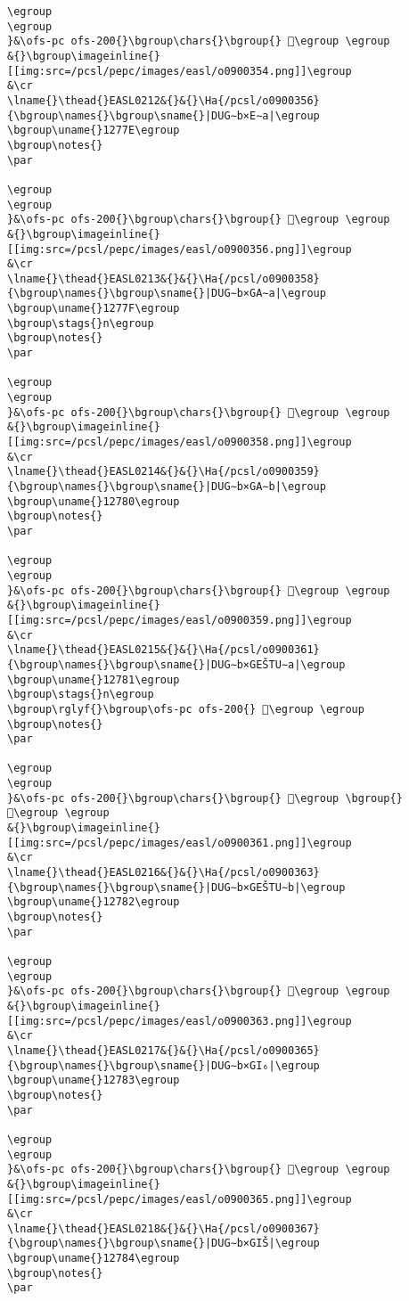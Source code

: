 \begin{verbatim}
\egroup
\egroup
}&\ofs-pc ofs-200{}\bgroup\chars{}\bgroup{} 𒝽\egroup \egroup
&{}\bgroup\imageinline{}[[img:src=/pcsl/pepc/images/easl/o0900354.png]]\egroup
&\cr
\lname{}\thead{}EASL0212&{}&{}\Ha{/pcsl/o0900356}{\bgroup\names{}\bgroup\sname{}|DUG∼b×E∼a|\egroup
\bgroup\uname{}1277E\egroup
\bgroup\notes{}
\par 

\egroup
\egroup
}&\ofs-pc ofs-200{}\bgroup\chars{}\bgroup{} 𒝾\egroup \egroup
&{}\bgroup\imageinline{}[[img:src=/pcsl/pepc/images/easl/o0900356.png]]\egroup
&\cr
\lname{}\thead{}EASL0213&{}&{}\Ha{/pcsl/o0900358}{\bgroup\names{}\bgroup\sname{}|DUG∼b×GA∼a|\egroup
\bgroup\uname{}1277F\egroup
\bgroup\stags{}n\egroup
\bgroup\notes{}
\par 

\egroup
\egroup
}&\ofs-pc ofs-200{}\bgroup\chars{}\bgroup{} 𒝿\egroup \egroup
&{}\bgroup\imageinline{}[[img:src=/pcsl/pepc/images/easl/o0900358.png]]\egroup
&\cr
\lname{}\thead{}EASL0214&{}&{}\Ha{/pcsl/o0900359}{\bgroup\names{}\bgroup\sname{}|DUG∼b×GA∼b|\egroup
\bgroup\uname{}12780\egroup
\bgroup\notes{}
\par 

\egroup
\egroup
}&\ofs-pc ofs-200{}\bgroup\chars{}\bgroup{} 𒞀\egroup \egroup
&{}\bgroup\imageinline{}[[img:src=/pcsl/pepc/images/easl/o0900359.png]]\egroup
&\cr
\lname{}\thead{}EASL0215&{}&{}\Ha{/pcsl/o0900361}{\bgroup\names{}\bgroup\sname{}|DUG∼b×GEŠTU∼a|\egroup
\bgroup\uname{}12781\egroup
\bgroup\stags{}n\egroup
\bgroup\rglyf{}\bgroup\ofs-pc ofs-200{} 𒞁\egroup \egroup
\bgroup\notes{}
\par 

\egroup
\egroup
}&\ofs-pc ofs-200{}\bgroup\chars{}\bgroup{} 𒞰\egroup \bgroup{} 𒞁\egroup \egroup
&{}\bgroup\imageinline{}[[img:src=/pcsl/pepc/images/easl/o0900361.png]]\egroup
&\cr
\lname{}\thead{}EASL0216&{}&{}\Ha{/pcsl/o0900363}{\bgroup\names{}\bgroup\sname{}|DUG∼b×GEŠTU∼b|\egroup
\bgroup\uname{}12782\egroup
\bgroup\notes{}
\par 

\egroup
\egroup
}&\ofs-pc ofs-200{}\bgroup\chars{}\bgroup{} 𒞂\egroup \egroup
&{}\bgroup\imageinline{}[[img:src=/pcsl/pepc/images/easl/o0900363.png]]\egroup
&\cr
\lname{}\thead{}EASL0217&{}&{}\Ha{/pcsl/o0900365}{\bgroup\names{}\bgroup\sname{}|DUG∼b×GI₆|\egroup
\bgroup\uname{}12783\egroup
\bgroup\notes{}
\par 

\egroup
\egroup
}&\ofs-pc ofs-200{}\bgroup\chars{}\bgroup{} 𒞃\egroup \egroup
&{}\bgroup\imageinline{}[[img:src=/pcsl/pepc/images/easl/o0900365.png]]\egroup
&\cr
\lname{}\thead{}EASL0218&{}&{}\Ha{/pcsl/o0900367}{\bgroup\names{}\bgroup\sname{}|DUG∼b×GIŠ|\egroup
\bgroup\uname{}12784\egroup
\bgroup\notes{}
\par 


\end{verbatim}
